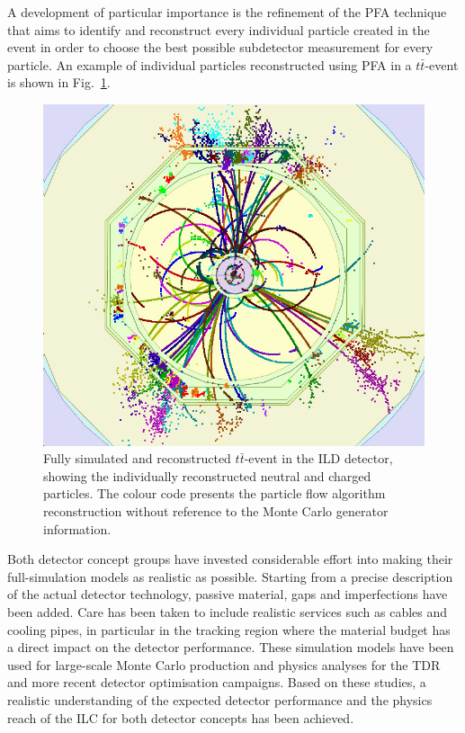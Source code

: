 \documentclass[%
reprint,
 floatfix,
 amsmath,amssymb,
 aps,
]{revtex4-1}
\def\Fig#1{Fig.~\ref{#1}}
\begin{document}
A development of particular importance is the refinement of the 
PFA technique  that aims to identify
and reconstruct
 every individual particle created in the event
 in order to choose the best possible subdetector measurement for every particle. 
An example of individual particles reconstructed using PFA 
 in a $t\bar t$-event is shown in \Fig{fig:ttbarevent}.
\begin{figure}
\begin{center}
\includegraphics[width=0.85\hsize]{figures/ttbar_event_ILD.jpg}
\end{center}
\caption{Fully simulated and reconstructed $t\bar t$-event in the ILD
  detector, showing the individually reconstructed neutral and charged
  particles. The colour code presents the
  particle flow algorithm reconstruction without
  reference to the Monte Carlo generator
  information.}
\label{fig:ttbarevent}
\vspace{-0.7cm}
\end{figure}

Both detector concept groups have invested considerable effort into 
making their full-simulation models as realistic as possible.
Starting from a precise description of the actual 
detector technology, passive material, gaps and imperfections have been added.
Care has been taken to include realistic services such as cables and 
cooling pipes, in particular in the tracking region where
the material budget has a direct impact on the detector performance.
These simulation models have been used for large-scale Monte Carlo
production
 and physics analyses for the TDR and more recent detector optimisation
campaigns. Based on these studies, a 
realistic understanding of the expected detector performance and the physics
reach of the ILC for both detector concepts has been
achieved.
\end{document}
